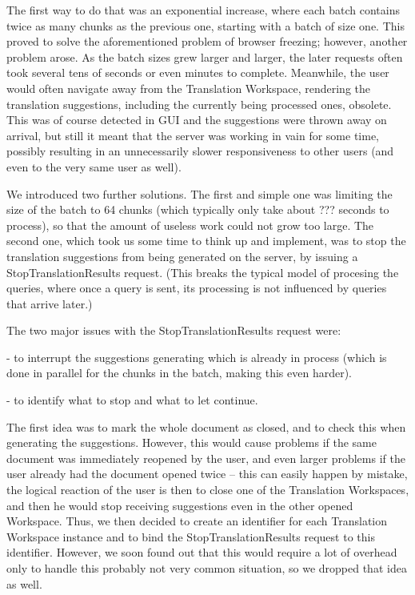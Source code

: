 The first way to do that was an exponential increase, where each batch contains twice as many chunks as the previous one, starting with a batch of size one. This proved to solve the aforementioned problem of browser freezing; however, another problem arose. As the batch sizes grew larger and larger, the later requests often took several tens of seconds or even minutes to complete. Meanwhile, the user would often navigate away from the Translation Workspace, rendering the translation suggestions, including the currently being processed ones, obsolete. This was of course detected in GUI and the suggestions were thrown away on arrival, but still it meant that the server was working in vain for some time, possibly resulting in an unnecessarily slower responsiveness to other users (and even to the very same user as well).

We introduced two further solutions. The first and simple one was limiting the size of the batch to 64 chunks (which typically only take about ??? seconds to process), so that the amount of useless work could not grow too large. The second one, which took us some time to think up and implement, was to stop the translation suggestions from being generated on the server, by issuing a StopTranslationResults request. (This breaks the typical model of procesing the queries, where once a query is sent, its processing is not influenced by queries that arrive later.)

The two major issues with the StopTranslationResults request were:

- to interrupt the suggestions generating which is already in process (which is done in parallel for the chunks in the batch, making this even harder).

- to identify what to stop and what to let continue.

The first idea was to mark the whole document as closed, and to check this when generating the suggestions. However, this would cause problems if the same document was immediately reopened by the user, and even larger problems if the user already had the document opened twice -- this can easily happen by mistake, the logical reaction of the user is then to close one of the Translation Workspaces, and then he would stop receiving suggestions even in the other opened Workspace. Thus, we then decided to create an identifier for each Translation Workspace instance and to bind the StopTranslationResults request to this identifier. However, we soon found out that this would require a lot of overhead only to handle this probably not very common situation, so we dropped that idea as well.

